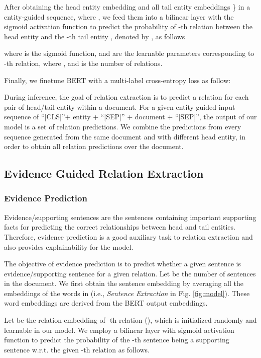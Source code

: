 \documentclass[11pt,a4paper]{article}
\begin{document}
After obtaining the head entity embedding  and all tail entity embeddings \} in a entity-guided sequence, where , we feed them into a bilinear layer with the sigmoid activation function to predict the probability of -th relation between the head entity  and the -th tail entity , denoted by , as follows

where  is the sigmoid function,  and  are the learnable parameters corresponding to -th relation, where , and  is the number of relations. 

Finally, we finetune BERT with a multi-label cross-entropy loss as follow:



During inference, the goal of relation extraction is to predict a relation for each pair of head/tail entity within a document.
For a given entity-guided input sequence of ``[CLS]''+ entity + ``[SEP]'' + document + ``[SEP]'', the output of our model is a set of  relation predictions.
We combine the predictions from every sequence generated from the same document and with different head entity, in order to obtain all relation predictions over the document. 


\subsection{Evidence Guided Relation Extraction}
\label{subsec:evidencePred}


\subsubsection{Evidence Prediction}
\label{subsec:evid}



Evidence/supporting sentences are the sentences containing important supporting facts for predicting the correct relationships between head and tail entities. Therefore, evidence prediction is a good auxiliary task to relation extraction and also provides explainability for the model. 

The objective of evidence prediction is to predict whether a given sentence is evidence/supporting sentence for a given relation.
Let  be the number of sentences in the document. We first obtain the sentence embedding  by averaging all the embeddings of the words in  (i.e., \textit{Sentence Extraction} in Fig. \ref{fig:model}). 
These word embeddings are derived from the BERT output embeddings. 

Let  be the relation embedding of -th relation (), which is initialized randomly and learnable in our model. 
We employ a bilinear layer with sigmoid activation function to predict the probability of the -th sentence  being a supporting sentence w.r.t. the given -th relation  as follows.
\end{document}
